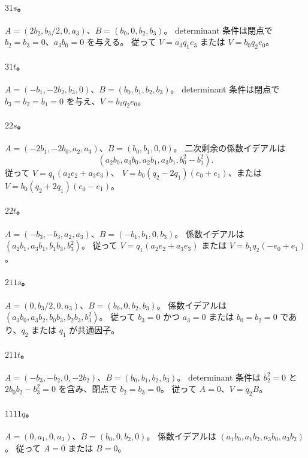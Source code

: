 \documentclass[11pt,a4paper]{ltjsarticle}
\theoremstyle{remark}\newtheorem{remark}[theorem]{注意}
\begin{document}
\paragraph{$31s$。}
$A=(2b_2,b_3/2,0,a_3)$、$B=(b_0,0,b_2,b_3)$。
determinant 条件は閉点で $b_2=b_3=0$、$a_3b_0=0$ を与える。
従って $V=a_3q_1e_3$ または $V=b_0q_2e_0$。

\paragraph{$31t$。}
$A=(-b_1,-2b_2,b_3,0)$、$B=(b_0,b_1,b_2,b_3)$。
determinant 条件は閉点で $b_3=b_2=b_1=0$ を与え、$V=b_0q_2e_0$。

\paragraph{$22s$。}
$A=(-2b_1,-2b_0,a_2,a_3)$、$B=(b_0,b_1,0,0)$。
二次剰余の係数イデアルは
\[
(a_2b_0,a_3b_0,a_2b_1,a_3b_1,b_0^2-b_1^2).
\]
従って $V=q_1(a_2e_2+a_3e_3)$、
$V=b_0(q_2-2q_1)(e_0+e_1)$、または $V=b_0(q_2+2q_1)(e_0-e_1)$。

\paragraph{$22t$。}
$A=(-b_3,-b_3,a_2,a_3)$、$B=(-b_1,b_1,0,b_3)$。
係数イデアルは $(a_2b_1,a_3b_1,b_1b_3,b_3^2)$。
従って $V=q_1(a_2e_2+a_3e_3)$ または $V=b_1q_2(-e_0+e_1)$。

\paragraph{$211s$。}
$A=(0,b_3/2,0,a_3)$、$B=(b_0,0,b_2,b_3)$。
係数イデアルは $(a_3b_0,a_3b_2,b_0b_3,b_2b_3,b_3^2)$。
従って $b_3=0$ かつ $a_3=0$ または $b_0=b_2=0$ であり、$q_2$ または $q_1$ が共通因子。

\paragraph{$211t$。}
$A=(-b_3,-b_2,0,-2b_2)$、$B=(b_0,b_1,b_2,b_3)$。
determinant 条件は $b_2^2=0$ と $2b_0b_2-b_3^2=0$ を含み、閉点で $b_2=b_3=0$。
従って $A=0$、$V=q_2B$。

\paragraph{$1111q$。}
$A=(0,a_1,0,a_3)$、$B=(b_0,0,b_2,0)$。
係数イデアルは $(a_1b_0,a_1b_2,a_3b_0,a_3b_2)$。
従って $A=0$ または $B=0$。
\end{document}
